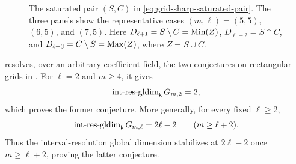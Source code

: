 \begin{figure}[t]

\caption{The saturated pair $(S,C)$ in
\eqref{eq:grid-sharp-saturated-pair}. The three panels show the
representative cases $(m,\ell)=(5,5)$, $(6,5)$, and $(7,5)$. Here
$D_{\ell+1}=S\setminus C=\operatorname{Min}(Z)$, $D_{\ell+2}=S\cap C$, and
$D_{\ell+3}=C\setminus S=\operatorname{Max}(Z)$, where $Z=S\cup C$.}
\label{fig:grid-SC-three-cases}
\end{figure}







\begin{remark}
\label{rem:AENY-grid-conjectures}
 resolves, over an arbitrary coefficient field, the two conjectures on
rectangular grids in
\cite[Conjectures~4.11 and~4.12]{AENY}.
For $\ell=2$ and $m\geq4$, it gives
\begin{equation}
\label{eq:AENY-height-two-conjecture}
\operatorname{int\text{-}res\text{-}gldim}_{\mathsf{k}} G_{m,2}=2,
\end{equation}
which proves the former conjecture.
More generally, for every fixed $\ell\geq2$,
\begin{equation}
\label{eq:AENY-grid-stabilization}
\operatorname{int\text{-}res\text{-}gldim}_{\mathsf{k}} G_{m,\ell}=2\ell-2
\qquad
(m\geq\ell+2).
\end{equation}
Thus the interval-resolution global dimension stabilizes at
$2\ell-2$ once $m\geq\ell+2$, proving the latter conjecture.
\end{remark}


